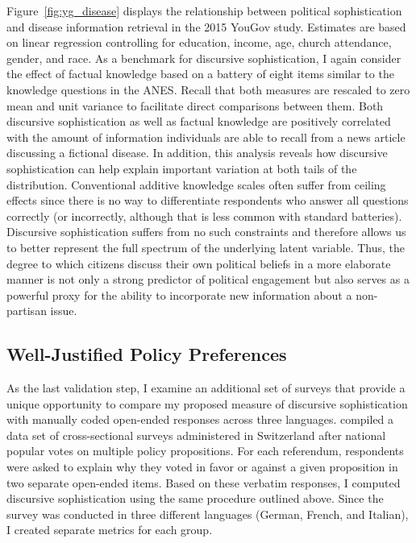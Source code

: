 Figure~\ref{fig:yg_disease} displays the relationship between political sophistication and disease information retrieval in the 2015 YouGov study. Estimates are based on linear regression controlling for education, income, age, church attendance, gender, and race. As a benchmark for discursive sophistication, I again consider the effect of factual knowledge based on a battery of eight items similar to the knowledge questions in the ANES. Recall that both measures are rescaled to zero mean and unit variance to facilitate direct comparisons between them. Both discursive sophistication as well as factual knowledge are positively correlated with the amount of information individuals are able to recall from a news article discussing a fictional disease. In addition, this analysis reveals how discursive sophistication can help explain important variation at both tails of the distribution. Conventional additive knowledge scales often suffer from ceiling effects since there is no way to differentiate respondents who answer all questions correctly (or incorrectly, although that is less common with standard batteries). Discursive sophistication suffers from no such constraints and therefore allows us to better represent the full spectrum of the underlying latent variable. Thus, the degree to which citizens discuss their own political beliefs in a more elaborate manner is not only a strong predictor of political engagement but also serves as a powerful proxy for the ability to incorporate new information about a non-partisan issue.


\subsection*{Well-Justified Policy Preferences}
As the last validation step, I examine an additional set of surveys that provide a unique opportunity to compare my proposed measure of discursive sophistication with manually coded open-ended responses across three languages.  \citet{colombo2016justifications} compiled a data set of cross-sectional surveys administered in Switzerland after national popular votes on multiple policy propositions. For each referendum, respondents were asked to explain why they voted in favor or against a given proposition in two separate open-ended items. Based on these verbatim responses, I computed discursive sophistication using the same procedure outlined above. Since the survey was conducted in three different languages (German, French, and Italian), I created separate metrics for each group.

